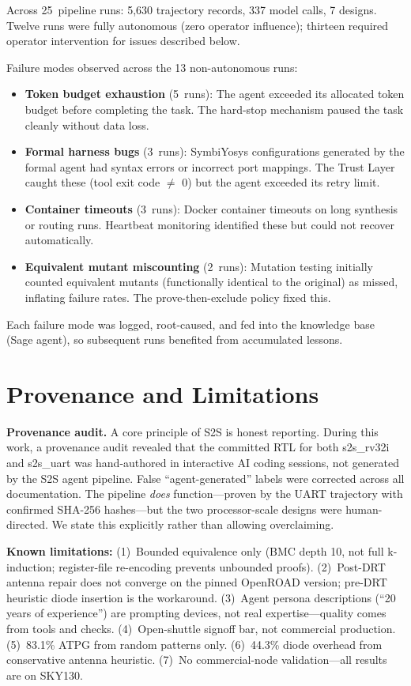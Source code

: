 \documentclass[journal]{IEEEtran}
\begin{document}
Across 25~pipeline runs: 5,630 trajectory records, 337 model calls, 7 designs. Twelve runs were fully autonomous (zero operator influence); thirteen required operator intervention for issues described below.

Failure modes observed across the 13 non-autonomous runs:
\begin{itemize}
    \item \textbf{Token budget exhaustion} (5~runs): The agent exceeded its allocated token budget before completing the task. The hard-stop mechanism paused the task cleanly without data loss.
    \item \textbf{Formal harness bugs} (3~runs): SymbiYosys configurations generated by the formal agent had syntax errors or incorrect port mappings. The Trust Layer caught these (tool exit code $\neq$ 0) but the agent exceeded its retry limit.
    \item \textbf{Container timeouts} (3~runs): Docker container timeouts on long synthesis or routing runs. Heartbeat monitoring identified these but could not recover automatically.
    \item \textbf{Equivalent mutant miscounting} (2~runs): Mutation testing initially counted equivalent mutants (functionally identical to the original) as missed, inflating failure rates. The prove-then-exclude policy fixed this.
\end{itemize}

Each failure mode was logged, root-caused, and fed into the knowledge base (Sage agent), so subsequent runs benefited from accumulated lessons.

\section{Provenance and Limitations}
\label{sec:provenance}

\textbf{Provenance audit.} A core principle of S2S is honest reporting. During this work, a provenance audit revealed that the committed RTL for both s2s\_rv32i and s2s\_uart was hand-authored in interactive AI coding sessions, not generated by the S2S agent pipeline. False ``agent-generated'' labels were corrected across all documentation. The pipeline \emph{does} function---proven by the UART trajectory with confirmed SHA-256 hashes---but the two processor-scale designs were human-directed. We state this explicitly rather than allowing overclaiming.

\textbf{Known limitations:} (1)~Bounded equivalence only (BMC depth 10, not full k-induction; register-file re-encoding prevents unbounded proofs). (2)~Post-DRT antenna repair does not converge on the pinned OpenROAD version; pre-DRT heuristic diode insertion is the workaround. (3)~Agent persona descriptions (``20 years of experience'') are prompting devices, not real expertise---quality comes from tools and checks. (4)~Open-shuttle signoff bar, not commercial production. (5)~83.1\% ATPG from random patterns only. (6)~44.3\% diode overhead from conservative antenna heuristic. (7)~No commercial-node validation---all results are on SKY130.
\end{document}
